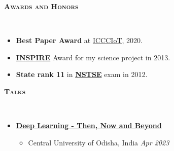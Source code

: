 \documentclass[10pt]{article}
\renewcommand{\section}[1]{
\bigskip
  \begin{Large}
  {\textsc{\textbf{#1}}}
  \end{Large}
  \hrulefill
  \medskip
  \\
}
\newenvironment{midlist}[1][\enskip\textbullet]%
        {\begin{itemize}[#1,leftmargin=*,parsep=0pt,itemsep=2pt,topsep=0pt,partopsep=0pt]}
        {\end{itemize}}
\newenvironment{lonemidlist}[1][\enskip\textbullet]%
        {\begin{itemize}[#1,leftmargin=*,parsep=0pt,itemsep=4pt,topsep=0pt,partopsep=0pt]}
        {\end{itemize}}
\begin{document}
\section{Awards and Honors}
\vspace{-4mm}
\begin{midlist}
\item \textbf{Best Paper Award} at \href{https://link.springer.com/book/10.1007/978-981-15-6198-6}{ICCCIoT}, 2020.
\item \href{https://online-inspire.gov.in/}{\textbf{INSPIRE}} Award for my science project in 2013. 
\item \textbf{State rank 11} in \href{https://www.unifiedcouncil.com/about-nstse-online.html}{\textbf{NSTSE}} exam in 2012.
\end{midlist}
\vspace{1.0mm}


\section{Talks}
\vspace{-4mm}
\begin{lonemidlist}
\item\href{https://docs.google.com/presentation/d/1B4fY_jALCVDi2TN13jeHtQngEngYqBdBN9k7VFwzvgE/edit#slide=id.p}{\textbf{Deep Learning - Then, Now and Beyond}}
\begin{itemize}
    \item Central University of Odisha, India \hfill{\textit{Apr 2023}}
\end{itemize}
\end{lonemidlist}
\end{document}
